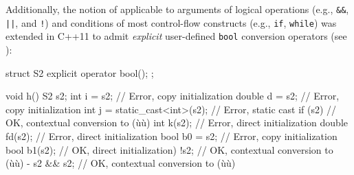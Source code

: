 \noindent Additionally, the notion of 
applicable to arguments of logical operations
(e.g., \lstinline!&&!, \lstinline!||!, and \lstinline|!|) and conditions of
most control-flow constructs (e.g., \lstinline!if!, \lstinline!while!) was
extended in C++11 to admit \emph{explicit} user-defined \lstinline!bool!
conversion operators (see ):

\begin{emcppslisting}
struct S2 { explicit operator bool(); };

void h()
{
    S2 s2;
    int i = s2;                    // Error, copy initialization
    double d = s2;                 // Error, copy initialization
    int j = static_cast<int>(s2);  // Error, static cast
    if (s2) { }                    // OK, contextual conversion to (ù{}ù)
    int k(s2);                     // Error, direct initialization
    double fd(s2);                 // Error, direct initialization
    bool b0 = s2;                  // Error, copy initialization
    bool b1(s2);                   // OK, direct initialization)
    !s2;                           // OK, contextual conversion to (ù{}ù)                                               -
    s2 && s2;                      // OK, contextual conversion to (ù{}ù)
}
\end{emcppslisting}

